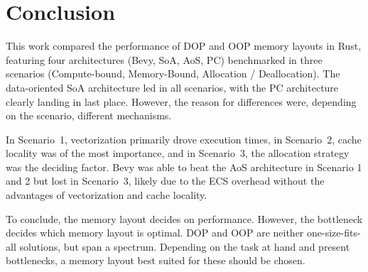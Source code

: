  
\cleardoubleoddpage
\chapter{Conclusion}
\label{sec:conclusion}
This work compared the performance of \ac{DOP} and \ac{OOP} memory layouts in Rust, featuring four architectures (Bevy, \ac{SoA}, \ac{AoS}, \ac{PC}) benchmarked in three scenarios (Compute-bound, Memory-Bound, Allocation / Deallocation). The data-oriented \ac{SoA} architecture led in all scenarios, with the \ac{PC} architecture clearly landing in last place. However, the reason for differences were, depending on the scenario, different mechanisms.

In Scenario~1, vectorization primarily drove execution times, in Scenario~2, cache locality was of the most importance, and in Scenario~3, the allocation strategy was the deciding factor. Bevy was able to beat the \ac{AoS} architecture in Scenario 1 and 2 but lost in Scenario~3, likely due to the \ac{ECS} overhead without the advantages of vectorization and cache locality. 

To conclude, the memory layout decides on performance. However, the bottleneck decides which memory layout is optimal. \ac{DOP} and \ac{OOP} are neither one-size-fits-all solutions, but span a spectrum. Depending on the task at hand and present bottlenecks, a memory layout best suited for these should be chosen. 

